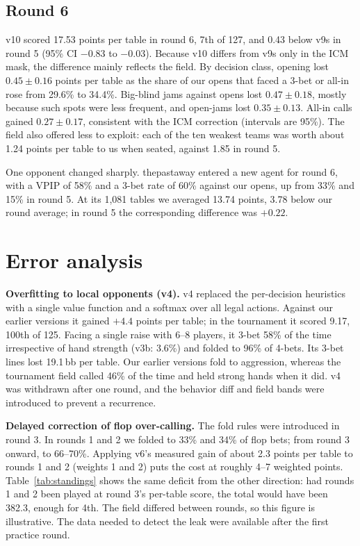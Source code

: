 \documentclass[10pt]{article}
\begin{document}
\subsection{Round 6}

v10 scored 17.53 points per table in round 6, 7th of 127, and 0.43 below v9s in round 5 (95\% CI $-0.83$ to $-0.03$). Because v10 differs from v9s only in the ICM mask, the difference mainly reflects the field. By decision class, opening lost $0.45\pm0.16$ points per table as the share of our opens that faced a 3-bet or all-in rose from 29.6\% to 34.4\%. Big-blind jams against opens lost $0.47\pm0.18$, mostly because such spots were less frequent, and open-jams lost $0.35\pm0.13$. All-in calls gained $0.27\pm0.17$, consistent with the ICM correction (intervals are 95\%). The field also offered less to exploit: each of the ten weakest teams was worth about 1.24 points per table to us when seated, against 1.85 in round 5.

One opponent changed sharply. thepastaway entered a new agent for round 6, with a VPIP of 58\% and a 3-bet rate of 60\% against our opens, up from 33\% and 15\% in round 5. At its 1,081 tables we averaged 13.74 points, 3.78 below our round average; in round 5 the corresponding difference was $+0.22$.

\section{Error analysis}\label{sec:errors}

\textbf{Overfitting to local opponents (v4).} v4 replaced the per-decision heuristics with a single value function and a softmax over all legal actions. Against our earlier versions it gained $+4.4$ points per table; in the tournament it scored 9.17, 100th of 125. Facing a single raise with 6--8 players, it 3-bet 58\% of the time irrespective of hand strength (v3b: 3.6\%) and folded to 96\% of 4-bets. Its 3-bet lines lost 19.1\,bb per table. Our earlier versions fold to aggression, whereas the tournament field called 46\% of the time and held strong hands when it did. v4 was withdrawn after one round, and the behavior diff and field bands were introduced to prevent a recurrence.

\textbf{Delayed correction of flop over-calling.} The fold rules were introduced in round 3. In rounds 1 and 2 we folded to 33\% and 34\% of flop bets; from round 3 onward, to 66--70\%. Applying v6's measured gain of about 2.3 points per table to rounds 1 and 2 (weights 1 and 2) puts the cost at roughly 4--7 weighted points. Table~\ref{tab:standings} shows the same deficit from the other direction: had rounds 1 and 2 been played at round 3's per-table score, the total would have been 382.3, enough for 4th. The field differed between rounds, so this figure is illustrative. The data needed to detect the leak were available after the first practice round.
\end{document}
